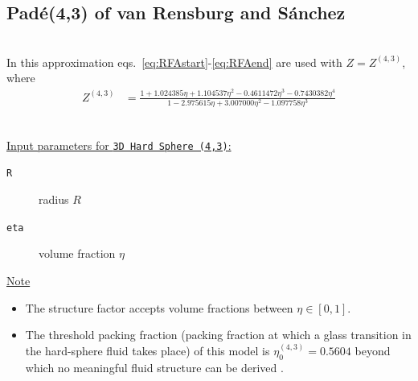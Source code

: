 \clearpage
\subsection{Pad\'{e}(4,3) of van Rensburg and S\'{a}nchez} \cite{Rensburg1993,Sanchez1994} ~\\

\noindent In this approximation eqs.\ \ref{eq:RFAstart}-\ref{eq:RFAend} are used with $Z=Z^{(4,3)}$, where
\begin{align}
Z^{(4,3)} &= \frac{1+1.024385\eta+1.104537\eta^2-0.4611472\eta^3-0.7430382\eta^4}{1-2.975615\eta+3.007000\eta^2-1.097758\eta^3}
\end{align}

\vspace{5mm}

\hspace{1pt}\\
\uline{Input parameters for \texttt{3D Hard Sphere (4,3)}:}
\begin{description}
    \item[\texttt{R}]  radius $R$
    \item[\texttt{eta}] volume fraction $\eta$
\end{description}

\noindent
\uline{Note}
\begin{itemize}
\item The structure factor accepts volume fractions between $\eta \in [0,1]$.
\item The threshold packing fraction (packing
fraction at which a glass transition in the hard-sphere fluid takes place) of this model is $\eta^{(4,3)}_0 = 0.5604$  beyond
which no meaningful fluid structure can be derived \cite{Haro2004}.
\end{itemize}

